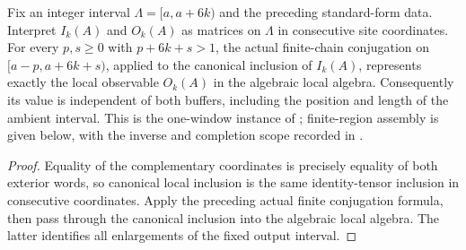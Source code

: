 \begin{lemma}
    \label{thm:mpu_finite_heisenberg_canonical_window}
    \leanok
    Fix an integer interval $\Lambda=[a,a+6k)$ and the preceding
    standard-form data. Interpret $I_k(A)$ and $O_k(A)$ as matrices
    on $\Lambda$ in consecutive site coordinates. For every $p,s\ge0$
    with $p+6k+s>1$, the actual finite-chain conjugation on
    $[a-p,a+6k+s)$, applied to the canonical inclusion of $I_k(A)$,
    represents exactly the local observable $O_k(A)$ in the algebraic
    local algebra. Consequently its value is independent of both
    buffers, including the position and length of the ambient interval.
    This is the one-window instance of
    \cite[lines~2300--2306]{Cirac2017MPU}; finite-region assembly is
    given below, with the inverse and completion scope recorded in
    \cite{gap:mpu_qca_complete_block_heisenberg_scope}.
\end{lemma}
\begin{proof}\leanok
    Equality of the complementary coordinates is precisely equality
    of both exterior words, so canonical local inclusion is the same
    identity-tensor inclusion in consecutive coordinates. Apply the
    preceding actual finite conjugation formula, then pass through
    the canonical inclusion into the algebraic local algebra. The
    latter identifies all enlargements of the fixed output interval.
\end{proof}


